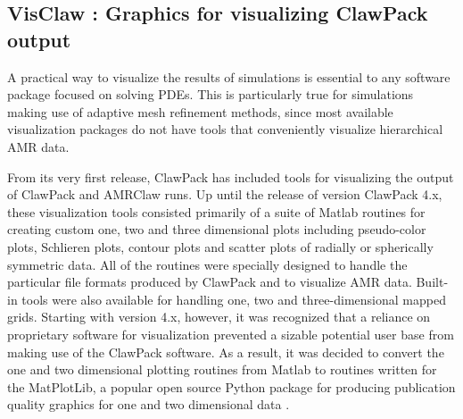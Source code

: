 %
%
%

\newcommand{\cpack}{{\sc ClawPack}\xspace}

\newcommand{\vclaw}{{\sc VisClaw}\xspace}
\newcommand{\aclaw}{{\sc AMRClaw\xspace}\xspace}
\newcommand{\gclaw}{{\sc GeoClaw\xspace}\xspace}
\newcommand{\cclaw}{{\sc Classic Claw}\xspace}
\newcommand{\pclaw}{{\sc PyClaw}\xspace}
\newcommand{\agis}{{\sc ArcGIS}\xspace}
\newcommand{\qgis}{{\sc QGIS}\xspace}

\newcommand{\mlab}{{\sc Matlab}\xspace}
\newcommand{\mplotlib}{{\sc MatPlotLib}\xspace}
\newcommand{\visit}{{\sc VisIt}\xspace}

\subsection{VisClaw : Graphics for visualizing \cpack output}
A practical way to visualize the results of simulations is
essential to any software package focused on solving PDEs.
This is particularly true for simulations making use of adaptive mesh
refinement methods, since most available visualization packages do not
have tools that conveniently visualize hierarchical AMR data.

From its very first release,
\cpack has included tools for visualizing the output of \cpack and
\aclaw runs.  Up until the release of version \cpack 4.x, these
visualization tools consisted primarily of a suite of \mlab routines
for creating custom one, two and three dimensional plots including
pseudo-color plots, Schlieren plots, contour plots and scatter plots
of radially or spherically symmetric data. All of the routines were
specially designed to handle the particular file formats produced by
\cpack and to visualize AMR data.  Built-in tools were also available
for handling one, two and three-dimensional mapped grids.
Starting with version 4.x, however, it was recognized that a reliance
on proprietary software for visualization prevented a sizable
potential user base from making use of the \cpack software.  As a
result, it was decided to convert the one and two dimensional plotting
routines from \mlab to routines written for the \mplotlib, a popular open source
Python package for producing publication quality graphics
for one and two dimensional data \cite{Hunter:2007}.

